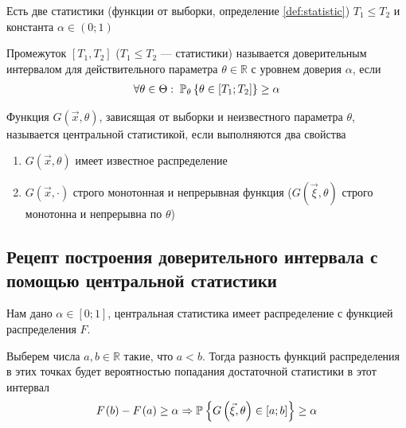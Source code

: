 Есть две статистики (функции от выборки, определение \ref{def:statistic})
$T_1 \le T_2$ и константа $\alpha \in \left( 0; 1 \right)$

\begin{definition}
  Промежуток $\left[ T_1, T_2 \right]$ ($T_1 \le T_2$ --- статистики)
  называется доверительным интервалом для действительного параметра
  $\theta \in \mathbb{R}$ с уровнем доверия $\alpha$, если
  \begin{align*}
      \forall \theta \in \Theta:\;
      \Probability[\theta]{\theta \in \left[ T_1; T_2 \right]} \ge \alpha
  \end{align*}
\end{definition}

\begin{definition}
  Функция $G\left( \vec{x}, \theta \right)$, зависящая от выборки и
  неизвестного параметра $\theta$, называется центральной статистикой,
  если выполняются два свойства
  \begin{enumerate}
      \item $G\left( \vec{x}, \theta \right)$ имеет известное распределение
      \item $G\left( \vec{x}, \cdot \right)$ строго монотонная и непрерывная
      функция ($G\left( \vec{\xi}, \theta \right)$ строго монотонна и
      непрерывна по $\theta$)
  \end{enumerate}
\end{definition}

\subsection{Рецепт построения доверительного интервала с помощью центральной
  статистики}

Нам дано $\alpha \in \left[ 0; 1 \right]$, центральная статистика имеет
распределение с функцией распределения $F$.

Выберем числа $a, b \in \mathbb{R}$ такие, что $a < b$. Тогда разность функций
распределения в этих точках будет вероятностью попадания достаточной статистики
в этот интервал
\begin{align*}
  \cdf{b} - \cdf{a} \ge \alpha \Rightarrow
  \Probability{G\left( \vec{\xi}, \theta \right) \in \left[ a; b \right]}
  \ge \alpha
\end{align*}

